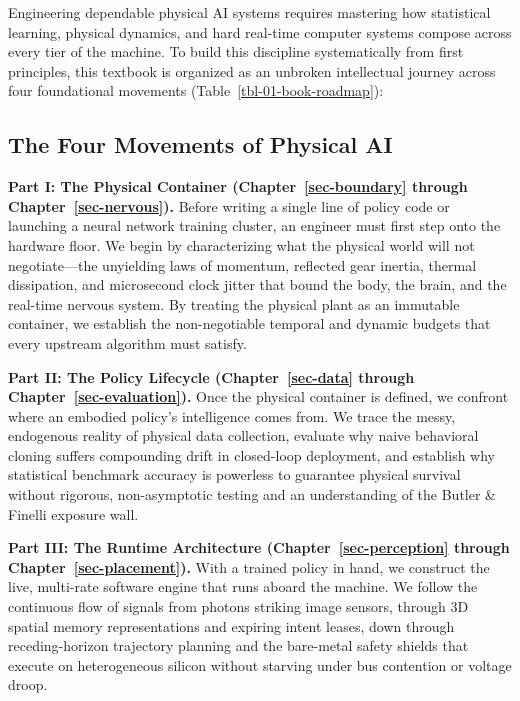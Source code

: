\documentclass[
  10pt,
  letterpaper,
  twoside,
  openright,
  numbers=noenddot,
  headings=standardclasses
]{scrbook}
\begin{document}
Engineering dependable physical AI systems requires mastering how
statistical learning, physical dynamics, and hard real-time computer
systems compose across every tier of the machine. To build this
discipline systematically from first principles, this textbook is
organized as an unbroken intellectual journey across four foundational
movements (Table~\ref{tbl-01-book-roadmap}):

\subsection{The Four Movements of Physical
AI}\label{the-four-movements-of-physical-ai}

\textbf{Part I: The Physical Container (Chapter~\ref{sec-boundary}
through Chapter~\ref{sec-nervous}).} Before writing a single line of
policy code or launching a neural network training cluster, an engineer
must first step onto the hardware floor. We begin by characterizing what
the physical world will not negotiate---the unyielding laws of momentum,
reflected gear inertia, thermal dissipation, and microsecond clock
jitter that bound the body, the brain, and the real-time nervous system.
By treating the physical plant as an immutable container, we establish
the non-negotiable temporal and dynamic budgets that every upstream
algorithm must satisfy.

\textbf{Part II: The Policy Lifecycle (Chapter~\ref{sec-data} through
Chapter~\ref{sec-evaluation}).} Once the physical container is defined,
we confront where an embodied policy's intelligence comes from. We trace
the messy, endogenous reality of physical data collection, evaluate why
naive behavioral cloning suffers compounding drift in closed-loop
deployment, and establish why statistical benchmark accuracy is
powerless to guarantee physical survival without rigorous,
non-asymptotic testing and an understanding of the Butler \& Finelli
exposure wall.

\textbf{Part III: The Runtime Architecture (Chapter~\ref{sec-perception}
through Chapter~\ref{sec-placement}).} With a trained policy in hand, we
construct the live, multi-rate software engine that runs aboard the
machine. We follow the continuous flow of signals from photons striking
image sensors, through 3D spatial memory representations and expiring
intent leases, down through receding-horizon trajectory planning and the
bare-metal safety shields that execute on heterogeneous silicon without
starving under bus contention or voltage droop.
\end{document}

